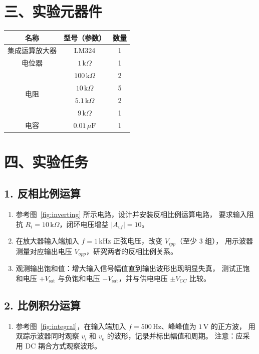 \documentclass[a4paper,12pt]{article}
\begin{document}
\section*{三、实验元器件}
\begin{table}[H]
    \centering
    \begin{tabular}{|c|c|c|}
        \hline
            \textbf{名称} & \textbf{型号（参数）} & \textbf{数量} \\
        \hline
        集成运算放大器 & LM324 & 1 \\
        \hline
        电位器 & $1\,\mathrm{k}\Omega$ & 1 \\
        \hline
        \multirow{4}{*}{电阻} & $100\,\mathrm{k}\Omega$ & 2 \\
        \cline{2-3}
        & $10\,\mathrm{k}\Omega$ & 5 \\
        \cline{2-3}
        & $5.1\,\mathrm{k}\Omega$ & 2 \\
        \cline{2-3}
        & $9\,\mathrm{k}\Omega$ & 1 \\
        \hline
        电容 & $0.01\,\mu\mathrm{F}$ & 1 \\
        \hline
    \end{tabular}
\end{table}

\section*{四、实验任务}
\subsection*{1. 反相比例运算}
\begin{enumerate}
    \item 参考图~\ref{fig:inverting} 所示电路，设计并安装反相比例运算电路，
          要求输入阻抗 $R_i = 10\,\mathrm{k}\Omega$，闭环电压增益 $|A_{vf}| = 10$。
    \item 在放大器输入端加入 $f = 1\,\mathrm{kHz}$ 正弦电压，改变 $V_{ipp}$（至少 3 组），
          用示波器测量对应输出电压 $V_{opp}$，研究两者的反相比例关系。
    \item 观测输出饱和值：增大输入信号幅值直到输出波形出现明显失真，
          测试正饱和电压 $+V_{\mathrm{sat}}$ 与负饱和电压 $-V_{\mathrm{sat}}$，并与供电电压 $\pm V_{CC}$ 比较。
\end{enumerate}

\subsection*{2. 比例积分运算}
\begin{enumerate}
    \item 参考图~\ref{fig:integral}，在输入端加入 $f = 500\,\mathrm{Hz}$、峰峰值为 $1\,\mathrm{V}$ 的正方波，
          用双踪示波器同时观察 $v_i$ 和 $v_o$ 的波形，记录并标出幅值和周期。
          注意：应采用 DC 耦合方式观察波形。
\end{enumerate}
\end{document}
